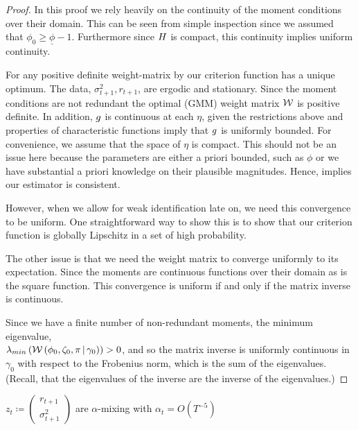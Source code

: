 \documentclass[11pt, letterpaper, twoside, final]{article}
\begin{document}
\begin{appendices}
\begin{proof}

    In this proof we rely heavily on the continuity of the moment conditions over their domain. 
    This can be seen from simple inspection since we assumed that $\phi_0 \geq \underline{\phi} -1$.
    Furthermore since $H$ is compact, this continuity implies uniform continuity.
    
    For any positive definite weight-matrix by \textcite[Lemma 2.3]{newey1994large} our criterion function has
    a unique optimum.
    The data, $\sigma^2_{t+1}, r_{t+1}$, are ergodic and stationary.
    Since the moment conditions are not redundant the optimal (GMM) weight matrix $\mathcal{W}$ is positive definite. 
    In addition, $g$ is continuous at each $\eta$, given the restrictions above and properties of
    characteristic functions imply that $g$ is uniformly bounded. 
    For convenience, we assume that the space of $\eta$ is compact.
    This should not be an issue here because the parameters  are either a priori bounded, such as $\phi$ or we
    have substantial a priori knowledge on their plausible magnitudes.
    Hence, \textcite[Theroem 2.6]{newey1994large} implies our estimator is consistent.
    
    However, when we allow for weak identification late on, we need this convergence to be uniform. 
    One straightforward way to show this is to show that our criterion function is globally Lipschitz in a set of
    high probability. 
    
    The other issue is that we need the weight matrix to converge uniformly to its expectation.
    Since the moments are continuous functions over their domain as is the square function.
    This convergence is uniform if and only if the matrix inverse is continuous.
    
    Since we have a finite number of non-redundant moments, the minimum eigenvalue, \\
    $\lambda_{min}\left(\mathcal{W}\left(\phi_0, \zeta_0, \pi \,\middle\vert\, \gamma_0\right)\right) > 0$, and so the matrix inverse
    is uniformly continuous in $\gamma_0$ with respect to the Frobenius norm, which is the sum of the eigenvalues.
    (Recall, that the eigenvalues of the inverse are the inverse of the eigenvalues.)


\end{proof}


\begin{assump}
    \label{assumption:weak_dependence}
    $z_t \coloneqq \begin{pmatrix} r_{t+1} \\ \sigma^2_{t+1} \end{pmatrix}$ are $\alpha$-mixing with $\alpha_t =
       O\left(T^{-5}\right)$
\end{assump}



\end{appendices}
\end{document}
